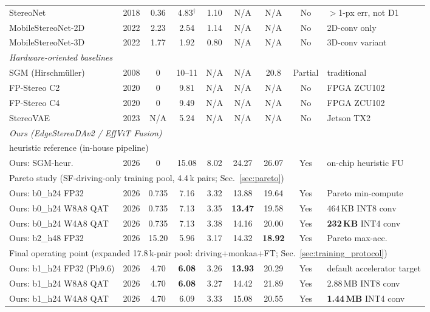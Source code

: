 \begin{table}[!t]
{\begin{tabular}{|l|c|c|c|c|c|c|c|l|}
\hline
StereoNet         & 2018 & 0.36  & 4.83$^\dagger$ & 1.10 & N/A & N/A & No & $>$1-px err, not D1 \\
MobileStereoNet-2D & 2022 & 2.23  & 2.54 & 1.14 & N/A & N/A & No & 2D-conv only \\
MobileStereoNet-3D & 2022 & 1.77  & 1.92 & 0.80 & N/A & N/A & No & 3D-conv variant \\
\hline
\multicolumn{9}{|l|}{\textit{Hardware-oriented baselines}} \\
\hline
SGM (Hirschm\"uller)   & 2008 & 0 & 10--11 & N/A & N/A & 20.8 & Partial & traditional \\
FP-Stereo C2      & 2020 & 0 & 9.81 & N/A & N/A & N/A & No & FPGA ZCU102 \\
FP-Stereo C4      & 2020 & 0 & 9.49 & N/A & N/A & N/A & No & FPGA ZCU102 \\
StereoVAE         & 2023 & N/A   & 5.24 & N/A & N/A & N/A & No & Jetson TX2 \\
\hline
\multicolumn{9}{|l|}{\textit{Ours (EdgeStereoDAv2 / EffViT Fusion)}} \\
\hline
\multicolumn{9}{|l|}{\quad heuristic reference (in-house pipeline)} \\
Ours: SGM-heur.            & 2026 & 0     & 15.08 & 8.02 & 24.27 & 26.07 & Yes & on-chip heuristic FU \\
\hline
\multicolumn{9}{|l|}{\quad Pareto study (SF-driving-only training pool, 4.4\,k pairs; Sec.~\ref{sec:pareto})} \\
Ours: b0\_h24 FP32         & 2026 & 0.735 & 7.16  & 3.32 & 13.88 & 19.64 & Yes & Pareto min-compute \\
Ours: b0\_h24 W8A8 QAT     & 2026 & 0.735 & 7.13  & 3.35 & \textbf{13.47} & 19.58 & Yes & 464\,KB INT8 conv \\
Ours: b0\_h24 W4A8 QAT     & 2026 & 0.735 & 7.13  & 3.38 & 14.16 & 20.00 & Yes & \textbf{232\,KB} INT4 conv \\
Ours: b2\_h48 FP32         & 2026 & 15.20 & 5.96  & 3.17 & 14.32 & \textbf{18.92} & Yes & Pareto max-acc. \\
\hline
\multicolumn{9}{|l|}{\quad Final operating point (expanded 17.8\,k-pair pool: driving+monkaa+FT; Sec.~\ref{sec:training_protocol})} \\
Ours: b1\_h24 FP32 (Ph9.6) & 2026 & 4.70  & \textbf{6.08} & 3.26 & \textbf{13.93} & 20.29 & Yes & default accelerator target \\
Ours: b1\_h24 W8A8 QAT     & 2026 & 4.70  & \textbf{6.08} & 3.27 & 14.42 & 21.89 & Yes & 2.88\,MB INT8 conv \\
Ours: b1\_h24 W4A8 QAT     & 2026 & 4.70  & 6.09          & 3.33 & 15.08 & 20.55 & Yes & \textbf{1.44\,MB} INT4 conv \\
\hline
\end{tabular}%
}
\vspace{-3pt}
\end{table}

